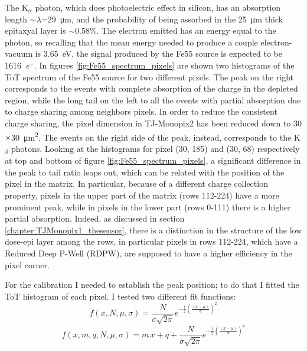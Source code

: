         The K$_\alpha$ photon, which does photoelectric effect in silicon, has an absorption length $\sim$$\lambda$=\SI{29}{\um}, and the probability of being assorbed in the \SI{25}{\um} thick epitaxyal layer is $\sim$0.58\%.
        The electron emitted has an energy equal to the photon, so recalling that the mean energy needed to produce a couple electron-vacuum is \SI{3.65}{eV}, the signal produced by the Fe55 source is expected to be \SI{1616}{\elementarycharge}$^-$.
        In figures \ref{fig:Fe55_spectrum_pixels} are shown two histograms of the ToT spectrum of the Fe55 source for two different pixels. The peak on the right corresponds to the events with complete absorption of the charge in the depleted region, while the long tail on the left to all the events with partial absorption due to charge sharing among neighbors pixels. In order to reduce the consistent charge sharing, the pixel dimension in TJ-Monopix2 has been reduced down to 30$\times$\SI{30}{\um\squared}. 
        The events on the right side of the peak, instead, corresponds to the K$_{\beta}$ photons. 
        Looking at the histograms for pixel (30, 185) and (30, 68) respectively at top and bottom of figure \ref{fig:Fe55_spectrum_pixels}, a significant difference in the peak to tail ratio leaps out, which can be related with the position of the pixel in the matrix.
        In particular, because of a different charge collection property, pixels in the upper part of the matrix (rows 112-224) have a more prominent peak, while in pixels in the lower part (rows 0-111) there is a higher partial absorption.
        Indeed, as discussed in section \ref{chapter:TJMonopix1_thesensor}, there is a distinction in the structure of the low dose-epi layer among the rows, in particular pixels in rows 112-224, which have a Reduced Deep P-Well (RDPW), are supposed to have a higher efficiency in the pixel corner. 
        
        For the calibration I needed to establish the peak position; to do that I fitted the ToT histogram of each pixel. I tested two different fit functions:  
        \begin{equation} \label{eq:gauss}
            f(x, N, \mu, \sigma) = \frac{N}{\sigma \sqrt{2\pi}} e^{-\frac{1}{2}(\frac{(x-\mu)}{\sigma})^2}
        \end{equation} 
        \begin{equation} \label{eq:gauss_line}
            f(x, m, q, N, \mu, \sigma) = m\,x + q + \frac{N}{\sigma \sqrt{2\pi}} e^{-\frac{1}{2}(\frac{(x-\mu)}{\sigma})^2}
        \end{equation}          
        
